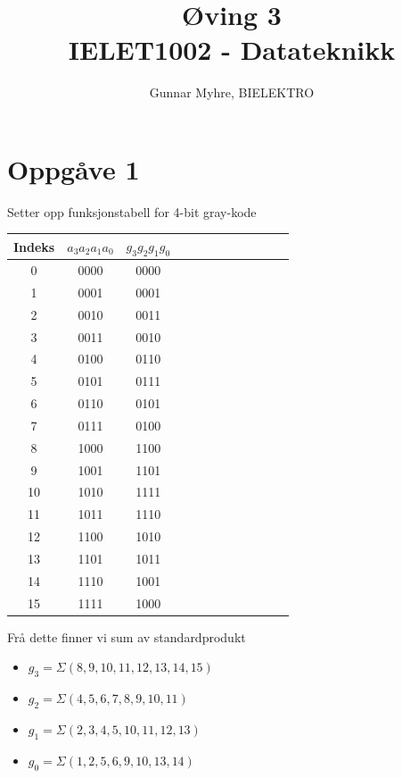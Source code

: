 \documentclass[12pt,a4paper]{article}
\title{%
  Øving 3 \\
  \large IELET1002 - Datateknikk \\
  }
\author{Gunnar Myhre, BIELEKTRO}
\begin{document}
  \maketitle
    \section{Oppgåve 1}
      Setter opp funksjonstabell for 4-bit gray-kode
      \begin{center}
        \begin{tabular}{ |c|c|c|c|c| c|c|c|c|c|c|c| }
          \hline
          Indeks & $a_3a_2a_1a_0$ & $g_3g_2g_1g_0$ \\
          \hline
          0  &  0000 & 0000 \\
          \hline
          1  &  0001 & 0001 \\
          \hline
          2  &  0010 & 0011 \\
          \hline
          3  &  0011 & 0010 \\
          \hline
          4  &  0100 & 0110 \\
          \hline
          5  &  0101 & 0111 \\
          \hline
          6  &  0110 & 0101 \\
          \hline
          7  &  0111 & 0100 \\
          \hline
          8  &  1000 & 1100 \\
          \hline
          9  &  1001 & 1101 \\
          \hline
          10 &  1010 & 1111 \\
          \hline
          11 &  1011 & 1110 \\
          \hline
          12 &  1100 & 1010 \\
          \hline
          13 &  1101 & 1011 \\
          \hline
          14 &  1110 & 1001 \\
          \hline
          15 &  1111 & 1000 \\
          \hline
        \end{tabular}
      \end{center}

      Frå dette finner vi sum av standardprodukt
      \begin{itemize}
        \item $g_3= \Sigma(8,9,10,11,12,13,14,15)$
        \item $g_2= \Sigma(4,5,6,7,8,9,10,11)$
        \item $g_1= \Sigma(2,3,4,5,10,11,12,13)$
        \item $g_0= \Sigma(1,2,5,6,9,10,13,14)$
      \end{itemize}
\end{document}
